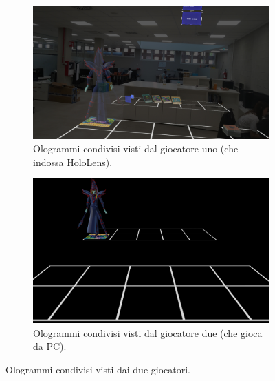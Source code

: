 \begin{figure}
    \centering

    \begin{subfigure}{0.6\textwidth}
        \centering
        \includegraphics[width=\linewidth]{images/OlogrammiCondivisi1.jpg}
        \caption{Ologrammi condivisi visti dal giocatore uno (che indossa HoloLens).}
        \label{fig:OlogrammiCondivisi1.jpg}
    \end{subfigure}

    \vspace{1cm}

    \begin{subfigure}{0.6\textwidth}
        \centering
        \includegraphics[width=\linewidth]{images/OlogrammiCondivisi2.png}
        \caption{Ologrammi condivisi visti dal giocatore due (che gioca da PC).}
        \label{fig:OlogrammiCondivisi2.jpg}
    \end{subfigure}

    \caption{Ologrammi condivisi visti dai due giocatori.}
    \label{fig:OlogrammiCondivisi.jpg}
\end{figure}

